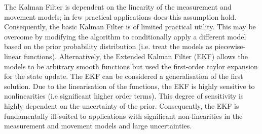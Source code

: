 \documentclass[english]{article}
\begin{document}
The Kalman Filter is dependent on the linearity of the measurement and movement models; in few practical applications does this assumption hold. Consequently, the basic Kalman Filter is of limited practical utility. This may be overcome by  modifying the algorithm to conditionally apply a different model based on the prior probability distribution (i.e. treat the models as piecewise-linear functions). Alternatively, the Extended Kalman Filter (EKF) allows the models to be arbitrary smooth functions but used the first-order taylor expansion for the state update. The EKF can be considered a generalisation of the first solution. Due to the linearisation of the functions, the EKF is highly sensitive to nonlinearities (i.e significant higher order terms). This degree of sensitivity is highly dependent on the uncertainty of the prior\cite{probrob}. Consequently, the EKF is fundamentally ill-suited to applications with significant non-linearities in the measurement and movement models and large uncertainties.




\end{document}
